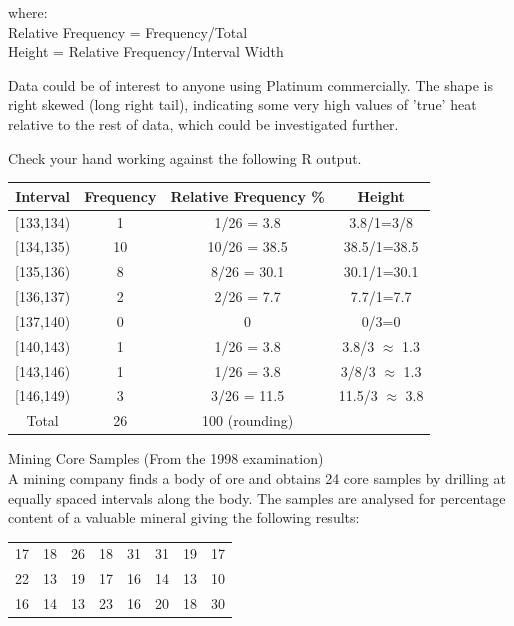 \documentclass[bigtut]{tutorial}\usepackage[]{graphicx}\usepackage[]{color}
\begin{document}
\begin{tutorial}
\begin{questions}
\begin{parts}
where: \\
Relative Frequency = Frequency/Total \\
Height = Relative Frequency/Interval Width
\end{parts}


\vspace{.5cm}
\begin{solution}
Data could be of interest to anyone using Platinum commercially. The shape is right skewed (long right tail), indicating some very high values of  'true' heat relative to the rest of data, which could be investigated further.
\end{solution}




\begin{solution}

Check your hand working against the following R output.

\vspace{.5cm}
\begin{tabular}{|c |c |c |c |} \hline
Interval & Frequency & Relative Frequency \% & Height \\ \hline
[133,134) & 1 & 1/26 = 3.8 & 3.8/1=3/8  \\ \hline
[134,135) & 10 & 10/26 = 38.5 &  38.5/1=38.5  \\ \hline
[135,136) & 8 & 8/26 =  30.1 & 30.1/1=30.1  \\ \hline
[136,137) & 2 & 2/26 = 7.7 &  7.7/1=7.7  \\ \hline
[137,140) & 0 & 0 & 0/3=0 \\ \hline
[140,143) & 1 & 1/26 = 3.8 & 3.8/3 $\approx$ 1.3  \\ \hline
[143,146) & 1 & 1/26 = 3.8  & 3/8/3 $\approx$ 1.3 \\ \hline
[146,149) & 3  & 3/26 =  11.5 & 11.5/3 $\approx$ 3.8  \\ \hline
Total & 26 &  100 (rounding) & \\ \hline
\end{tabular}
\end{solution}


\question Mining Core Samples  (From the 1998 examination)  \\

A mining company finds a body of ore and obtains 24 core samples by drilling at equally spaced intervals along the body. The samples are analysed for percentage content of a valuable mineral giving the following results:


  \begin{center}
  \begin{tabular}{llllllll}
 17&18&26&18&31&31&19&17\\
 22&13&19&17&16&14&13&10\\
 16&14&13&23&16&20&18&30
 \end{tabular}
   \end{center}
                       

\end{questions}
\end{tutorial}
\end{document}
